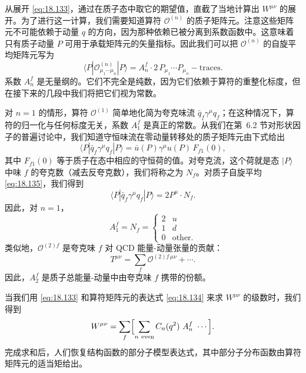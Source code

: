 从展开 \eqref{eq:18.133}，通过在质子态中取它的期望值，直截了当地计算出 $W^{\mu\nu}$ 的展开。为了进行这一计算，我们需要知道算符 $\mathcal{O}^{(n)}$ 的质子矩阵元。注意这些矩阵元不可能依赖于动量 $q$ 的方向，因为那种依赖已被分离到系数函数中。这意味着只有质子动量 $P$ 可用于承载矩阵元的矢量指标。因此我们可以把 $\mathcal{O}^{(n)}$ 的自旋平均矩阵元写为
\begin{equation}
  \langle P|\mathcal{O}^{(n)}_{\mu_1\cdots\mu_n}|P\rangle = A_n^f\cdot
    2\,P_{\mu_1}\cdots P_{\mu_n} - \text{traces} .
  \label{eq:18.134}
\end{equation}
系数 $A_n^f$ 是无量纲的。它们不完全是纯数，因为它们依赖于算符的重整化标度，但在接下来的几段中我们将把它们视为常数。

对 $n = 1$ 的情形，算符 $\mathcal{O}^{(1)}$ 简单地化简为夸克味流 $\bar{q}_f\gamma^\mu q_f$；在这种情况下，算符的归一化与任何标度无关，系数 $A_1^f$ 是真正的常数。从我们在第~6.2 节对形状因子的普遍讨论中，我们知道守恒味流在零动量转移处的质子矩阵元由下式给出
\begin{equation}
  \langle P|\bar{q}_f\gamma^\mu q_f|P\rangle = \bar{u}(P)\gamma^\mu u(P)\,
    F_{f1}(0) ,
  \label{eq:18.135}
\end{equation}
其中 $F_{f1}(0)$ 等于质子在态中相应的守恒荷的值。对夸克流，这个荷就是态 $|P\rangle$ 中味 $f$ 的夸克数（减去反夸克数），我们将称之为 $N_f$。对质子自旋平均 \eqref{eq:18.135}，我们得到
\begin{equation}
  \langle P|\bar{q}_f\gamma^\mu q_f|P\rangle = 2P^\mu\cdot N_f .
  \label{eq:18.136}
\end{equation}
因此，对 $n = 1$，
\begin{equation}
  A_1^f = N_f = \begin{cases}2 & u\\ 1 & d\\ 0 & \text{other}.\end{cases}
  \label{eq:18.137}
\end{equation}
类似地，$\mathcal{O}^{(2)f}$ 是夸克味 $f$ 对 QCD 能量-动量张量的贡献：
\begin{equation}
  T^{\mu\nu} = \sum_f \mathcal{O}^{(2)f\,\mu\nu} + \cdots .
  \label{eq:18.138}
\end{equation}
因此，$A_2^f$ 是质子总能量-动量中由夸克味 $f$ 携带的份额。

当我们用 \eqref{eq:18.133} 和算符矩阵元的表达式 \eqref{eq:18.134} 来求 $W^{\mu\nu}$ 的级数时，我们得到
\begin{equation}
  W^{\mu\nu} = \sum_f \Bigl[ \sum_{n\ \text{even}} C_n(q^2)\ A_n^f\ \cdots
    \Bigr] .
  \label{eq:18.139}
\end{equation}
完成求和后，人们恢复结构函数的部分子模型表达式，其中部分子分布函数由算符矩阵元的适当矩给出。


